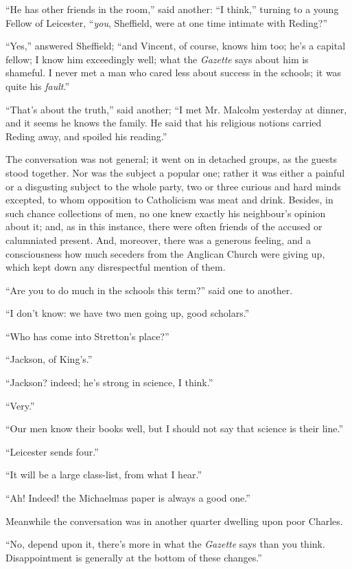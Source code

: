 ``He has other friends in the room,'' said another: ``I
think,'' turning to a young Fellow of Leicester, ``\emph{you},
Sheffield, were at one time intimate with Reding?''

``Yes,'' answered Sheffield; ``and Vincent, of course,
knows him too; he's a capital fellow; I know him exceedingly
well; what the \emph{Gazette} says about him is shameful. I never met
a man who cared less about success in the schools; it was quite his \emph{fault}.''

``That's about the truth,'' said another; ``I met Mr.
Malcolm yesterday at dinner, and it seems he knows the family. He said
that his religious notions carried Reding away, and spoiled his
reading.''

The conversation was not general; it went on in detached groups, as
the guests stood together. Nor was the subject a popular one; rather
it was either a painful or a disgusting subject to the whole party,
two or three curious and hard minds excepted, to whom opposition to
Catholicism was meat and drink. Besides, in such chance collections of
men, no one knew exactly his neighbour's opinion about it; and, as in
this instance, there were often friends of the accused or calumniated
present. And, moreover, there was a generous feeling, and a
consciousness how much seceders from the Anglican Church were giving
up, which kept down any disrespectful mention of them.

``Are you to do much in the schools this term?'' said one
to another.

``I don't know: we have two men going up, good scholars.''

``Who has come into Stretton's place?''

``Jackson, of King's.''

``Jackson? indeed; he's strong in science, I think.''

``Very.''

``Our men know their books well, but I should not say that
science is their line.''

``Leicester sends four.''

``It will be a large class-list, from what I hear.''

``Ah! Indeed! the Michaelmas paper is always a good one.''

Meanwhile the conversation was in another quarter dwelling upon
poor Charles.

``No, depend upon it, there's more in what the \emph{Gazette}
says than you think. Disappointment is generally at the bottom of
these changes.''

